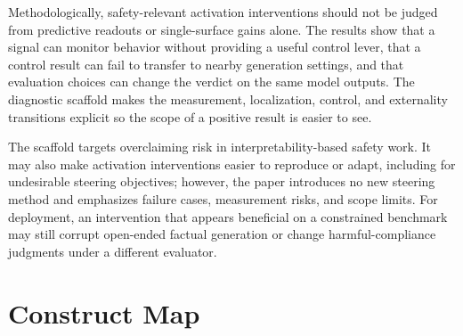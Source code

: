 \documentclass{article}
\begin{document}
Methodologically, safety-relevant activation interventions should not be judged from predictive readouts or single-surface gains alone.
The results show that a signal can monitor behavior without providing a useful control lever, that a control result can fail to transfer to nearby generation settings, and that evaluation choices can change the verdict on the same model outputs.
The diagnostic scaffold makes the measurement, localization, control, and externality transitions explicit so the scope of a positive result is easier to see.

The scaffold targets overclaiming risk in interpretability-based safety work.
It may also make activation interventions easier to reproduce or adapt, including for undesirable steering objectives; however, the paper introduces no new steering method and emphasizes failure cases, measurement risks, and scope limits.
For deployment, an intervention that appears beneficial on a constrained benchmark may still corrupt open-ended factual generation or change harmful-compliance judgments under a different evaluator.




\clearpage
\onecolumn
\appendix

\section{Construct Map}
\label{app:constructs}
\end{document}
